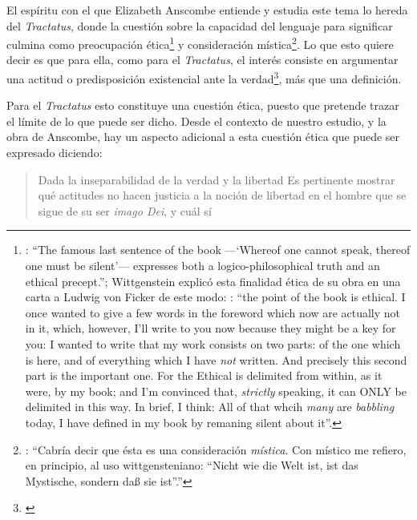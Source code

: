 El espíritu con el que Elizabeth Anscombe entiende y estudia este tema lo hereda del \emph{Tractatus}, donde la cuestión sobre la capacidad del lenguaje para significar culmina como preocupación ética\footnote{\cite[Cf.][156]{monk1991duty}: \enquote{The famous last sentence of the book ---`Whereof one cannot speak, thereof one must be silent'--- expresses both a logico-philosophical truth and an ethical precept.}; Wittgenstein explicó esta finalidad ética de su obra en una carta a Ludwig von Ficker de este modo: \cite[22-23]{monk2005howto}: \enquote{the point of the book is ethical. I once wanted to give a few words in the foreword which now are actually not in it, which, however, I'll write to you now because they might be a key for you: I wanted to write that my work consists on two parts: of the one which is here, and of everything which I have \emph{not} written. And precisely this second part is the important one. For the Ethical is delimited from within, as it were, by my book; and I'm convinced that, \emph{strictly} speaking, it can ONLY be delimited in this way. In brief, I think: All of that whcih \emph{many} are \emph{babbling} today, I have defined in my book by remaning silent about it}.} y consideración mística\footnote{\Cite[357]{dominguez2009at}: \enquote{Cabría decir que ésta es una consideración \emph{mística}. Con místico me refiero, en principio, al uso wittgensteniano: ``Nicht wie die Welt ist, ist das Mystische, sondern daß sie ist''.}}. Lo que esto quiere decir es que para ella, como para el \emph{Tractatus}, el interés consiste en argumentar una actitud o predisposición existencial ante la verdad\footnote{\Cite[Cf.][354-355]{dominguez2009at}}, más que una definición. 

Para el \emph{Tractatus} esto constituye una cuestión ética, puesto que pretende trazar el límite de lo que puede ser dicho. Desde el contexto de nuestro estudio, y la obra de Anscombe, hay un aspecto adicional a esta cuestión ética que puede ser expresado diciendo: \blockquote[{\Cite[354]{dominguez2009at}}]{Dada la inseparabilidad de la verdad y la libertad \textelp{} Es pertinente \textelp{} mostrar qué actitudes  no hacen justicia a la noción de libertad en el hombre que se sigue de su ser \emph{imago Dei}, y cuál sí}. 

